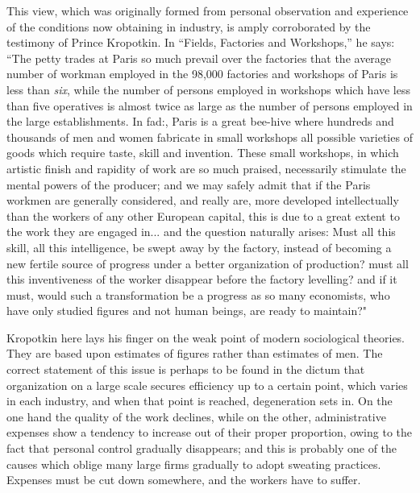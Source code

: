 \documentclass{book}
\begin{document}
This view, which was originally formed from personal observation and experience of the conditions now obtaining in industry, is amply corroborated by the testimony of Prince Kropotkin. In “Fields, Factories and Workshops,” he says: “The petty trades at Paris so much prevail over the factories that the average number of workman employed in the 98,000 factories and workshops of Paris is less than \emph{six}, while the number of persons employed in workshops which have less than five operatives is almost twice as large as the number of persons employed in the large establishments. In fad:, Paris is a great bee-hive where hundreds and thousands of men and women fabricate in small workshops all possible varieties of goods which require taste, skill and invention. These small workshops, in which artistic finish and rapidity of work are so much praised, necessarily stimulate the mental powers of the producer; and we may safely admit that if the Paris workmen are generally considered, and really are, more developed intellectually than the workers of any other European capital, this is due to a great extent to the work they are engaged in... and the question naturally arises: Must all this skill, all this intelligence, be swept away by the factory, instead of becoming a new fertile source of progress under a better organization of production? must all this inventiveness of the worker disappear before the factory levelling? and if it must, would such a transformation be a progress as so many economists, who have only studied figures and not human beings, are ready to maintain?"

Kropotkin here lays his finger on the weak point of modern sociological theories. They are based upon estimates of figures rather than estimates of men. The correct statement of this issue is perhaps to be found in the dictum that organization on a large scale secures efficiency up to a certain point, which varies in each industry, and when that point is reached, degeneration sets in. On the one hand the quality of the work declines, while on the other, administrative expenses show a tendency to increase out of their proper proportion, owing to the fact that personal control gradually disappears; and this is probably one of the causes which oblige many large firms gradually to adopt sweating practices. Expenses must be cut down somewhere, and the workers have to suffer.
\end{document}
